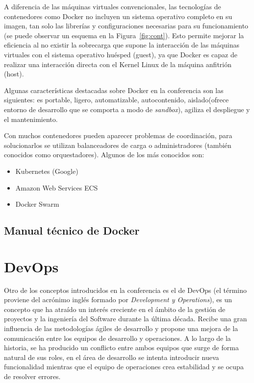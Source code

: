 A diferencia de las máquinas virtuales convencionales, las tecnologías de contenedores como Docker no incluyen un sistema operativo completo en su imagen, tan solo las librerías y configuraciones necesarias para su funcionamiento (se puede observar un esquema en la Figura~\ref{fig:cont}). Esto permite mejorar la eficiencia al no existir la sobrecarga que supone la interacción de las máquinas virtuales con el sistema operativo huésped (guest), ya que Docker es capaz de realizar una interacción directa con el Kernel Linux de la máquina anfitrión (host).

Algunas características destacadas sobre Docker en la conferencia son las siguientes: es portable, ligero, automatizable, autocontenido, aislado(ofrece entorno de desarrollo que se comporta a modo de \textit{sandbox}), agiliza el despliegue y el mantenimiento.

Con muchos contenedores pueden aparecer problemas de coordinación, para solucionarlos se utilizan balanceadores de carga o administradores (también conocidos como orquestadores). Algunos de los más conocidos son:
\begin{itemize}
\item Kubernetes (Google)
\item Amazon Web Services ECS
\item Docker Swarm
\end{itemize}

\subsection{Manual técnico de Docker}



\section{DevOps}\label{sec:devops}

Otro de los conceptos introducidos en la conferencia es el de DevOps (el término proviene del acrónimo inglés formado por \textit{Development y Operations}), es un concepto que ha atraído un interés creciente en el ámbito de la gestión de proyectos y la ingeniería del Software durante la última década. Recibe una gran influencia de las metodologías ágiles de desarrollo y propone una mejora de la comunicación entre los equipos de desarrollo y operaciones. A lo largo de la historia, se ha producido un conflicto entre ambos equipos que surge de forma natural de sus roles, en el área de desarrollo se intenta introducir nueva funcionalidad mientras que el equipo de operaciones crea estabilidad y se ocupa de resolver errores. 

